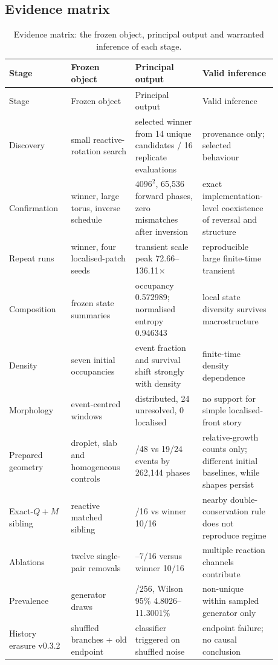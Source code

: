 \documentclass[11pt,a4paper]{article}
\begin{document}
\subsection{Evidence matrix}
\begin{longtable}{@{}>{\raggedright\arraybackslash}p{0.19\linewidth}>{\raggedright\arraybackslash}p{0.22\linewidth}>{\raggedright\arraybackslash}p{0.23\linewidth}>{\raggedright\arraybackslash}p{0.24\linewidth}@{}}
\caption{Evidence matrix: the frozen object, principal output and warranted inference of each stage.}\label{tab:evidence-matrix}\\
\toprule
Stage & Frozen object & Principal output & Valid inference \\
\midrule
\endfirsthead
\toprule
Stage & Frozen object & Principal output & Valid inference \\
\midrule
\endhead
Discovery & small reactive-rotation search & selected winner from 14 unique candidates / 16 replicate evaluations & provenance only; selected behaviour \\
Confirmation & winner, large torus, inverse schedule & $4096^2$, 65,536 forward phases, zero mismatches after inversion & exact implementation-level coexistence of reversal and structure \\
Repeat runs & winner, four localised-patch seeds & transient scale peak 72.66--136.11$\times$ & reproducible large finite-time transient \\
Composition & frozen state summaries & occupancy 0.572989; normalised entropy 0.946343 & local state diversity survives macrostructure \\
Density & seven initial occupancies & event fraction and survival shift strongly with density & finite-time density dependence \\
Morphology & event-centred windows & 67 distributed, 24 unresolved, 0 localised & no support for simple localised-front story \\
Prepared geometry & droplet, slab and homogeneous controls & 0/48 vs 19/24 events by 262,144 phases & relative-growth counts only; different initial baselines, while shapes persist \\
Exact-$Q{+}M$ sibling & reactive matched sibling & 0/16 vs winner 10/16 & nearby double-conservation rule does not reproduce regime \\
Ablations & twelve single-pair removals & 0--7/16 versus winner 10/16 & multiple reaction channels contribute \\
Prevalence & 256 generator draws & 19/256, Wilson 95\% 4.8026--11.3001\% & non-unique within sampled generator only \\
History erasure v0.3.2 & shuffled branches + old endpoint & classifier triggered on shuffled noise & endpoint failure; no causal conclusion \\
\bottomrule
\end{longtable}
\end{document}

